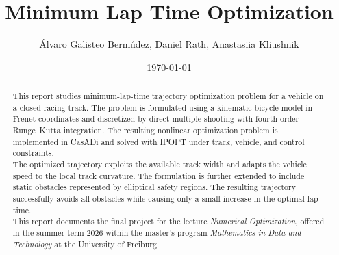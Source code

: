 \documentclass[12pt,a4paper,twoside]{amsart}  %
\title{Minimum Lap Time Optimization}
\author{Álvaro Galisteo Bermúdez, Daniel Rath, Anastasiia Kliushnik}
\date{\today}
\theoremstyle{plain}
\theoremstyle{definition}
\theoremstyle{remark}
\numberwithin{equation}{section} %
\begin{document}
	\begin{abstract}
    This report studies minimum-lap-time trajectory optimization problem for a vehicle on a closed racing track. The problem is formulated using a kinematic bicycle model in Frenet coordinates and discretized by direct multiple shooting with fourth-order Runge–Kutta integration. The resulting nonlinear optimization problem is implemented in CasADi and solved with IPOPT under track, vehicle, and control constraints.\\
	The optimized trajectory exploits the available track width and adapts the vehicle speed to the local track curvature. The formulation is further extended to include static obstacles represented by elliptical safety regions. The resulting trajectory successfully avoids all obstacles while causing only a small increase in the optimal lap time.\\
	This report documents the final project for the lecture \emph{Numerical Optimization}, offered in the summer term 2026 within the master’s program \emph{Mathematics in Data and Technology} at the University of Freiburg.
	\end{abstract}
	
	
    \maketitle
	\tableofcontents
	\newpage
    \restoregeometry
	
	
	
	
	
	\thispagestyle{empty}
	\printbibliography
\end{document}
